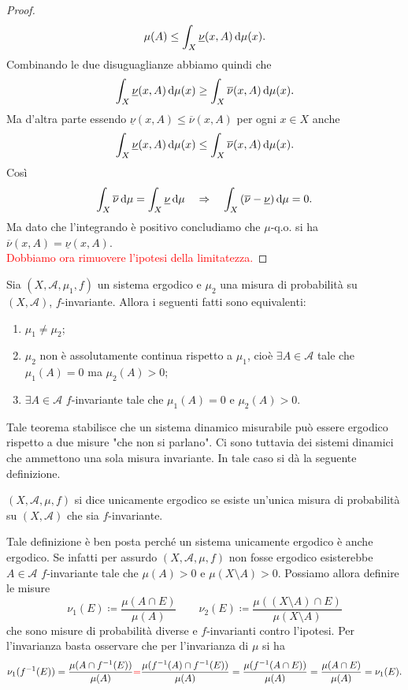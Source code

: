 \begin{proof}
    \[
        \mu(A) \leq \int_{X}\underline{\nu}(x, A) \dif{\mu}(x).
    \]
    Combinando le due disuguaglianze abbiamo quindi che
    \[
        \int_{X}\underline{\nu}(x, A) \dif{\mu}(x) \geq \int_{X}\overline{\nu}(x, A) \dif{\mu}(x).
    \]
    Ma d'altra parte essendo $ \underline{\nu}(x, A) \leq \overline{\nu}(x, A) $ per ogni $ x \in X $ anche
    \[
        \int_{X}\underline{\nu}(x, A) \dif{\mu}(x) \leq \int_{X}\overline{\nu}(x, A) \dif{\mu}(x).
    \]
    Così
    \[
        \int_{X} \overline{\nu} \dif{\mu} = \int_{X} \underline{\nu} \dif{\mu} \quad \Rightarrow \quad \int_{X} \left(\overline{\nu} - \underline{\nu}\right) \dif{\mu} = 0.
    \]
    Ma dato che l'integrando è positivo concludiamo che $ \mu $-q.o. si ha $ \overline{\nu}(x, A) = \underline{\nu}(x, A) $. \\
    \textcolor{red}{Dobbiamo ora rimuovere l'ipotesi della limitatezza.}
\end{proof}

\begin{proposition}
    Sia $ (X, \mathcal{A}, \mu_1, f) $ un sistema ergodico e $ \mu_2 $ una misura di probabilità su $ (X, \mathcal{A}) $, $ f $-invariante. Allora i seguenti fatti sono equivalenti:
    \begin{enumerate}[label=(\roman*)]
        \item $ \mu_1 \neq \mu_2 $;
        \item $ \mu_2 $ non è assolutamente continua rispetto a $ \mu_1 $, cioè $ \exists A \in \mathcal{A} $ tale che $ \mu_1(A) = 0 $ ma $ \mu_2(A) > 0 $;
        \item $ \exists A \in \mathcal{A} $ $ f $-invariante tale che $ \mu_1(A) = 0 $ e $ \mu_2(A) > 0 $.
    \end{enumerate}
\end{proposition}

Tale teorema stabilisce che un sistema dinamico misurabile può essere ergodico rispetto a due misure "che non si parlano". Ci sono tuttavia dei sistemi dinamici che ammettono una sola misura invariante. In tale caso si dà la seguente definizione.

\begin{definition}
    $ (X, \mathcal{A}, \mu, f) $ si dice unicamente ergodico se esiste un'unica misura di probabilità su $ (X, \mathcal{A}) $ che sia $ f $-invariante.
\end{definition}

Tale definizione è ben posta perché un sistema unicamente ergodico è anche ergodico. Se infatti per assurdo $ (X, \mathcal{A}, \mu, f) $ non fosse ergodico esisterebbe $ A \in \mathcal{A} $ $ f $-invariante tale che $ \mu(A) > 0 $ e $ \mu(X \setminus A) > 0 $. Possiamo allora definire le misure
\[
     \nu_1(E) \coloneqq \frac{\mu(A \cap E)}{\mu(A)}
     \qquad
     \nu_2(E) \coloneqq \frac{\mu((X \setminus A) \cap E)}{\mu(X \setminus A)}
\]
che sono misure di probabilità diverse e $ f $-invarianti contro l'ipotesi. Per l'invarianza basta osservare che per l'invarianza di $ \mu $ si ha
\[
    \nu_1(f^{-1}(E)) = \frac{\mu(A \cap f^{-1}(E))}{\mu(A)} \textcolor{red}{=} \frac{\mu(f^{-1}(A) \cap f^{-1}(E))}{\mu(A)} = \frac{\mu(f^{-1}(A \cap E))}{\mu(A)} = \frac{\mu(A \cap E)}{\mu(A)} = \nu_1(E).
\]

